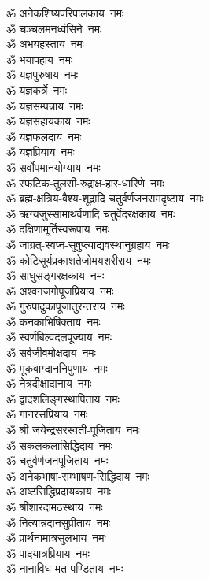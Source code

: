 \begin{flushleft}
\begin{multicols}{2}
ॐ अनेकशिष्यपरिपालकाय~नमः\\
ॐ चञ्चलमनध्वंसिने~नमः\\
ॐ अभयहस्ताय~नमः\\
ॐ भयापहाय~नमः\\
ॐ यज्ञपुरुषाय~नमः\hfill{}\\
ॐ यज्ञकर्त्रे~नमः\\
ॐ यज्ञसम्पन्नाय~नमः\\
ॐ यज्ञसहायकाय~नमः\\
ॐ यज्ञफलदाय~नमः\\
ॐ यज्ञप्रियाय~नमः\\
ॐ सर्वोपमानयोग्याय~नमः\\
ॐ स्फटिक-तुलसी-रुद्राक्ष-हार-धारिणे~नमः\\
ॐ ब्रह्म-क्षत्रिय-वैश्य-शूद्रादि चतुर्वर्णजनसमदृष्टाय~नमः\\
ॐ ऋग्यजुस्सामाथर्वणादि चतुर्वेदरक्षकाय~नमः\\
ॐ दक्षिणामूर्तिस्वरूपाय~नमः\hfill{}\\
ॐ जाग्रत्-स्वप्न-सुषुप्त्याद्यवस्थानुग्रहाय~नमः\\
ॐ कोटिसूर्यप्रकाशतेजोमय\-शरीराय~नमः\\
ॐ साधुसङ्गरक्षकाय~नमः\\
ॐ अश्वगजगोपूजप्रियाय~नमः\\
ॐ गुरुपादुकापूजातुरन्तराय~नमः\\
ॐ कनकाभिषिक्ताय~नमः\\
ॐ स्वर्णबिल्वदलपूज्याय~नमः\\
ॐ सर्वजीवमोक्षदाय~नमः\\
ॐ मूकवाग्दाननिपुणाय~नमः\\
ॐ नेत्रदीक्षादानाय~नमः\hfill{}\\
ॐ द्वादशलिङ्गस्थापिताय~नमः\\
ॐ गानरसप्रियाय~नमः\\
ॐ श्री जयेन्द्रसरस्वती-पूजिताय~नमः\\
ॐ सकलकलासिद्धिदाय~नमः\\
ॐ चतुर्वर्णजनपूजिताय~नमः\\
ॐ अनेकभाषा-सम्भाषण-सिद्धिदाय~नमः\\
ॐ अष्टसिद्धिप्रदायकाय~नमः\\
ॐ श्रीशारदामठस्थाय~नमः\\
ॐ नित्यान्नदानसुप्रीताय~नमः\\
ॐ प्रार्थनामात्रसुलभाय~नमः\hfill{}\\
ॐ पादयात्रप्रियाय~नमः\\
ॐ नानाविध-मत-पण्डिताय~नमः\\

\end{multicols}
\end{flushleft}

